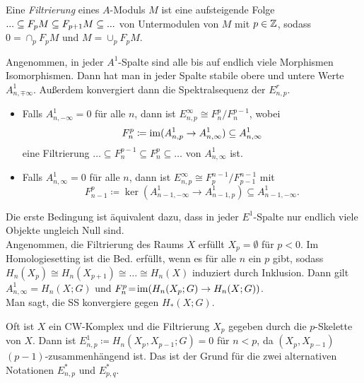 \documentclass{cheat-sheet}
\newcommand{\nacong}{\!\cong\!} %
\begin{document}
\begin{defn}
  Eine \emph{Filtrierung} eines $A$-Moduls $M$ ist eine aufsteigende Folge $... \subseteq F_p M \subseteq F_{p+1} M \subseteq ...$ von Untermodulen von $M$ mit $p \in \mathbb{Z}$, sodass $0 = \cap_p F_p M$ und $M = \cup_p F_p M$.
\end{defn}

\begin{prop}
  Angenommen, in jeder $A^1$-Spalte sind alle bis auf endlich viele Morphismen Isomorphismen. Dann hat man in jeder Spalte stabile obere und untere Werte $A^1_{n, \mp \infty}$. Außerdem konvergiert dann die Spektralsequenz der $E^r_{n,p}$.
  \begin{itemize}
    \item Falls $A^1_{n,-\infty} = 0$ für alle $n$, dann ist $E^\infty_{n,p} \cong F^p_n / F^{p-1}_n$, wobei
    \[ F^p_n \coloneqq \operatorname{im}(A^1_{n,p} \to A^1_{n,\infty}) \subseteq A^1_{n,\infty} \]
    eine Filtrierung $\ldots \subseteq F^{p-1}_n \subseteq F^p_n \subseteq \ldots$ von $A^1_{n,\infty}$ ist.
    \item Falls $A^1_{n,\infty} = 0$ für alle $n$, dann ist $E^\infty_{n,p} \cong F^{n-1}_p / F^{n-1}_{p-1}$ mit
    \[ F^p_{n-1} \coloneqq \ker(A^1_{n-1,-\infty} \to A^1_{n-1,p}) \subseteq A^1_{n-1,-\infty}. \]
  \end{itemize}
\end{prop}

\begin{bem}
  Die erste Bedingung ist äquivalent dazu, dass in jeder $E^1$-Spalte nur endlich viele Objekte ungleich Null sind. \\
  Angenommen, die Filtrierung des Raums $X$ erfüllt $X_p = \emptyset$ für $p < 0$.
  Im Homologiesetting ist die Bed. erfüllt, wenn es für alle $n$ ein $p$ gibt, sodass $H_n(X_p) \nacong H_n(X_{p+1}) \nacong \ldots \nacong H_n(X)$ induziert durch Inklusion.
  Dann gilt $A^1_{n,\infty} \!=\! H_n(X; G)$ und $F^p_n \!=\! \operatorname{im}(H_n(X_p; G) \to H_n(X; G))$. \\
  Man sagt, die SS konvergiere gegen $H_*(X; G)$.
\end{bem}

\begin{bem}
  Oft ist $X$ ein CW-Komplex und die Filtrierung $X_p$ gegeben durch die $p$-Skelette von $X$. Dann ist $E^1_{n,p} \coloneqq H_n(X_p, X_{p-1}; G) = 0$ für $n < p$, da $(X_p, X_{p-1})$ $(p\!-\!1)$-zusammenhängend ist. Das ist der Grund für die zwei alternativen Notationen $E^*_{n,p}$ und $E^*_{p,q}$.
\end{bem}
\end{document}
